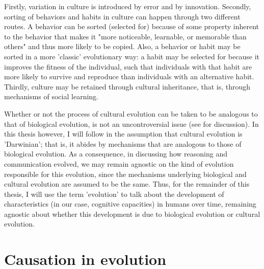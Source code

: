 Firstly, variation in culture is introduced by error and by innovation.
Secondly, sorting of behaviors and habits in culture can happen through two different routes. A behavior can be sorted (selected for) because of some property inherent to the behavior that makes it "more noticeable, learnable, or memorable than others" \citep[p.~34]{Heyes18} and thus more likely to be copied. Also, a behavior or habit may be sorted in a more 'classic' evolutionary way: a habit may be selected for because it improves the fitness of the individual, such that individuals with that habit are more likely to survive and reproduce than individuals with an alternative habit.
Thirdly, culture may be retained through cultural inheritance, that is, through mechanisms of social learning.

Whether or not the process of cultural evolution can be taken to be analogous to that of biological evolution, is not an uncontroversial issue (see \citealp{Claidiere14} for discussion).
In this thesis however, I will follow \citet{Heyes18} in the assumption that cultural evolution is 'Darwinian'; that is, it abides by mechanisms that are analogous to those of biological evolution.
As a consequence, in discussing how reasoning and communication evolved, we may remain agnostic on the kind of evolution responsible for this evolution, since the mechanisms underlying biological and cultural evolution are assumed to be the same.
Thus, for the remainder of this thesis, I will use the term 'evolution' to talk about the development of characteristics (in our case, cognitive capacities) in humans over time, remaining agnostic about whether this development is due to biological evolution or cultural evolution.


\section{Causation in evolution}
\label{sec:causation-evolution}

